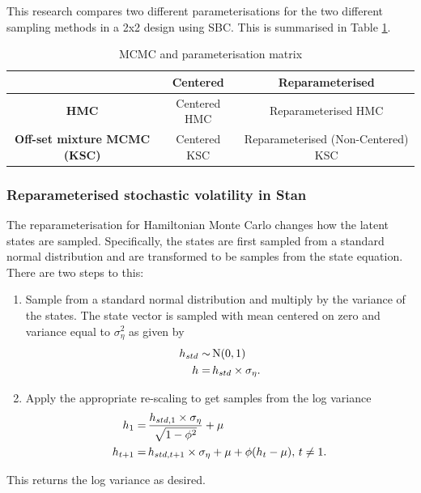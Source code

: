 \documentclass[12pt, a4paper]{article}
\begin{document}
        This research compares two different parameterisations for the two different sampling methods in a 2x2 design using SBC. This is summarised in Table \ref{tab:params}.
        \begin{table}
            \centering
            \begin{tabular}{|c|c|c|} \hline 
                 &  \textbf{Centered}& \textbf{Reparameterised}\\ \hline 
                 \textbf{HMC}&  Centered HMC& Reparameterised HMC\\ \hline 
                 \textbf{Off-set mixture MCMC (KSC)}&  Centered KSC& Reparameterised (Non-Centered) KSC\\ \hline
            \end{tabular}
            \caption{MCMC and parameterisation matrix}
            \label{tab:params}
        \end{table}
        
        \subsubsection{Reparameterised stochastic volatility in Stan}
        The reparameterisation for Hamiltonian Monte Carlo changes how the latent states are sampled. Specifically, the states are first sampled from a standard normal distribution and are transformed to be samples from the state equation. There are two steps to this:
        \begin{enumerate}
            
        \item Sample from a standard normal distribution and multiply by the variance of the states. The state vector is sampled with mean centered on zero and variance equal to $\sigma_{\eta}^2$ as given by
        \begin{align}
        h_{std} \sim&\space \,\mathrm{N}(0,1) \\
        h =& \space \, h_{std} \times \sigma_{\eta}.
        \end{align}
        \item Apply the appropriate re-scaling to get samples from the log variance
        \begin{align}
        h_1 =& \space \,\frac{h_{std, 1}\times \sigma_{\eta}} {\sqrt{1 - \phi^2}} + \mu \\
        h_{t+1} =& \space \,h_{std, t+1}\times \sigma_{\eta} + \mu  + \phi(h_{t} - \mu),\space \, t\neq 1.
        \end{align}
        \end{enumerate}
        This returns the log variance as desired.
        
\end{document}
